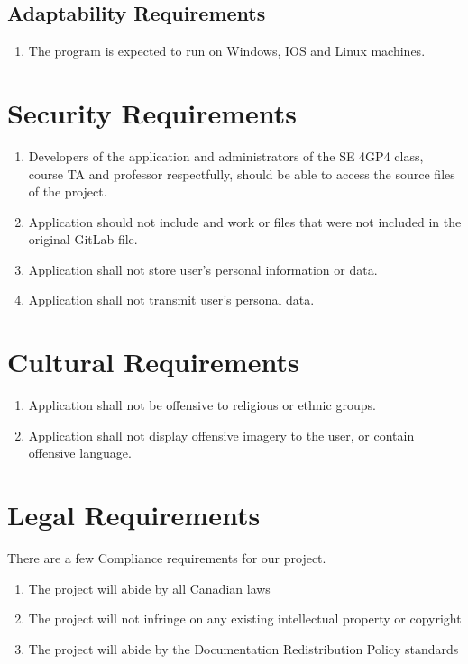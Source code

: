 \documentclass{article}
\begin{document}
\subsection{Adaptability Requirements}
\begin{enumerate}[{AR}1. ]
	\item The program is expected to run on Windows, IOS and Linux machines.
\end{enumerate}
\section{Security Requirements}
\begin{enumerate}[{SR}1. ]
	\item Developers of the application and administrators of the SE 4GP4 class, course TA and professor respectfully, should be able to access the source files of the project.
	\item Application should not include and work or files that were not included in the original GitLab file.
	\item Application shall not store user's personal information or data.
	\item Application shall not transmit user's personal data.
\end{enumerate}
\section{Cultural Requirements}
\begin{enumerate}[{CR}1. ]
	\item Application shall not be offensive to religious or ethnic groups.
	\item Application shall not display offensive imagery to the user, or contain offensive language.
\end{enumerate}
\section{Legal Requirements}
\quad There are a few Compliance requirements for our project.
\begin{enumerate}[{LR}1. ]
	\item The project will abide by all Canadian laws
	\item The project will not infringe on any existing intellectual property or copyright 
	\item The project will abide by the Documentation Redistribution Policy standards
\end{enumerate}
\end{document}

